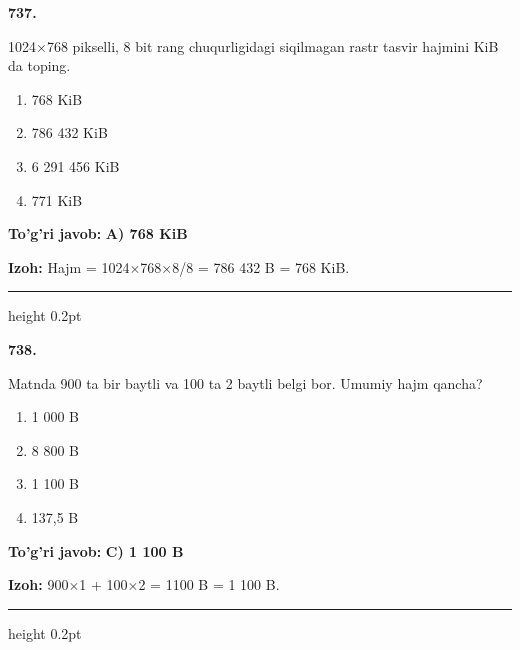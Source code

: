\documentclass[10pt,a4paper,oneside]{article}
\begin{document}
\noindent\textbf{\color{ink}737.}
\par
1024\ensuremath{\times}768 pikselli, 8 bit rang chuqurligidagi siqilmagan rastr tasvir hajmini KiB da toping.
\begin{enumerate}[label=\Alph*),leftmargin=9mm]
\item 768 KiB
\item 786 432 KiB
\item 6 291 456 KiB
\item 771 KiB
\end{enumerate}
\begin{tcolorbox}[enhanced,breakable,colback=teal!4,colframe=teal!50!black,boxrule=0.5pt,arc=1.1mm,left=3mm,right=3mm,top=1.7mm,bottom=1.7mm,before skip=2mm,after skip=2mm]
\textbf{\color{teal}To'g'ri javob:} \textbf{A) 768 KiB}
\par\smallskip
\textbf{Izoh:} Hajm = 1024\ensuremath{\times}768\ensuremath{\times}8/8 = 786 432 B = 768 KiB.
\end{tcolorbox}
\vspace{2mm}\hrule height 0.2pt \vspace{3mm}

\noindent\textbf{\color{ink}738.}
\par
Matnda 900 ta bir baytli va 100 ta 2 baytli belgi bor. Umumiy hajm qancha?
\begin{enumerate}[label=\Alph*),leftmargin=9mm]
\item 1 000 B
\item 8 800 B
\item 1 100 B
\item 137,5 B
\end{enumerate}
\begin{tcolorbox}[enhanced,breakable,colback=teal!4,colframe=teal!50!black,boxrule=0.5pt,arc=1.1mm,left=3mm,right=3mm,top=1.7mm,bottom=1.7mm,before skip=2mm,after skip=2mm]
\textbf{\color{teal}To'g'ri javob:} \textbf{C) 1 100 B}
\par\smallskip
\textbf{Izoh:} 900\ensuremath{\times}1 + 100\ensuremath{\times}2 = 1100 B = 1 100 B.
\end{tcolorbox}
\vspace{2mm}\hrule height 0.2pt \vspace{3mm}
\end{document}
